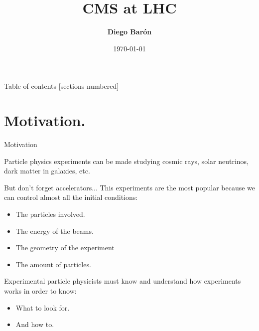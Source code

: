 \documentclass[8pt]{beamer}
\title{\textbf{\huge{CMS at LHC}}}
\date{\today}
\author{\textbf{Diego Barón}}
\institute{Universidad de Antioquia, Instutito de Física.}
\begin{document}
\maketitle

\begin{frame}{Table of contents}
  [sections numbered]
  \tableofcontents[hideallsubsections]
\end{frame}


\section{Motivation.}

\begin{frame}[fragile]{Motivation}

Particle physics experiments can be made studying cosmic rays, solar neutrinos, dark matter in galaxies, etc. 

\begin{exampleblock}{But don't forget accelerators... }
This experiments are the most popular because we can control almost all the initial conditions:
\begin{itemize}
\item The particles involved.
\item The energy of the beams.
\item The geometry of the experiment
\item The amount of particles. 
\end{itemize}    
\end{exampleblock}

Experimental particle physicists must know and understand how experiments works in order to know:
\begin{itemize}
\item What to look for.
\item And how to.
\end{itemize}

\end{frame}
\end{document}
